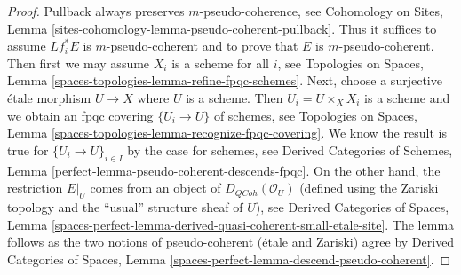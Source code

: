 \documentclass[10pt,a4paper]{amsart}
\theoremstyle{plain}
\theoremstyle{definition}
\theoremstyle{remark}
\numberwithin{equation}{subsection}
\def\QCoh{\mathit{QCoh}}
\begin{document}
\begin{proof}
Pullback always preserves $m$-pseudo-coherence, see
Cohomology on Sites, Lemma
\ref{sites-cohomology-lemma-pseudo-coherent-pullback}.
Thus it suffices to assume $Lf_i^*E$ is $m$-pseudo-coherent
and to prove that $E$ is $m$-pseudo-coherent.
Then first we may assume $X_i$ is a scheme for all $i$, see
Topologies on Spaces, Lemma \ref{spaces-topologies-lemma-refine-fpqc-schemes}.
Next, choose a  surjective \'etale morphism $U \to X$ where $U$ is a scheme.
Then $U_i = U \times_X X_i$ is a scheme and we obtain an fpqc covering
$\{U_i \to U\}$ of schemes, see
Topologies on Spaces, Lemma
\ref{spaces-topologies-lemma-recognize-fpqc-covering}.
We know the result is true for
$\{U_i \to U\}_{i \in I}$ by the case for schemes, see
Derived Categories of Schemes, Lemma
\ref{perfect-lemma-pseudo-coherent-descends-fpqc}.
On the other hand, the restriction $E|_U$ comes from
an object of $D_\QCoh(\mathcal{O}_U)$ (defined using the Zariski
topology and the ``usual'' structure sheaf of $U$), see
Derived Categories of Spaces, Lemma
\ref{spaces-perfect-lemma-derived-quasi-coherent-small-etale-site}.
The lemma follows as the two notions of pseudo-coherent
(\'etale and Zariski) agree by
Derived Categories of Spaces,
Lemma \ref{spaces-perfect-lemma-descend-pseudo-coherent}.
\end{proof}
\end{document}
